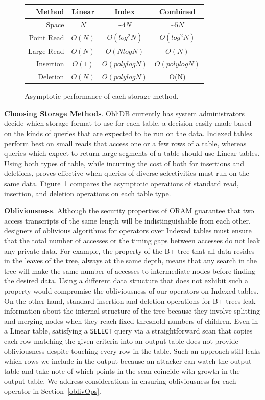 \documentclass[letterpaper,twocolumn,10pt]{article}
\def\name/{ObliDB}
\begin{document}
\begin{figure}
\small
\begin{tabular}{r|ccc}
Method&Linear&Index&Combined\\\hline
Space &$N$&\textasciitilde$4N$&\textasciitilde$5N$\\
Point Read&$O(N)$&$O(log^2N)$&$O(log^2N)$\\
Large Read&$O(N)$&$O(NlogN)$&$O(N)$\\
Insertion&$O(1)$&$O(polylogN)$&$O(polylogN)$\\
Deletion&$O(N)$&$O(polylogN)$&O(N)\\
\end{tabular}
\caption{\small Asymptotic performance of each storage method.}
\label{asymTables}
\end{figure}

\noindent \textbf{Choosing Storage Methods}. \name/ currently has system administrators decide which storage format to use for each table, a decision easily made based on the kinds of queries that are expected to be run on the data. Indexed tables perform best on small reads that access one or a few rows of a table, whereas queries which expect to return large segments of a table should use Linear tables. Using both types of table, while incurring the cost of both for insertions and deletions, proves effective when queries of diverse selectivities must run on the same data. Figure~\ref{asymTables} compares the asymptotic operations of standard read, insertion, and deletion operations on each table type.

 \noindent \textbf{Obliviousness}. Although the security properties of ORAM guarantee that two access transcripts of the same length will be indistinguishable from each other, designers of oblivious algorithms for operators over Indexed tables must ensure that the total number of accesses or the timing gaps between accesses do not leak any private data. For example, the property of the B+ tree that all data resides in the leaves of the tree, always at the same depth, means that any search in the tree will make the same number of accesses to intermediate nodes before finding the desired data. Using a different data structure that does not exhibit such a property would compromise the obliviousness of our operators on Indexed tables. On the other hand, standard insertion and deletion operations for B+ trees leak information about the internal structure of the tree because they involve splitting and merging nodes when they reach fixed threshold numbers of children. Even in a Linear table, satisfying a \texttt{SELECT} query via a straightforward scan that copies each row matching the given criteria into an output table does not provide obliviousness despite touching every row in the table. Such an approach still leaks which rows we include in the output because an attacker can watch the output table and take note of which points in the scan coincide with growth in the output table. We address considerations in ensuring obliviousness for each operator in Section~\ref{oblivOps}.
\end{document}
